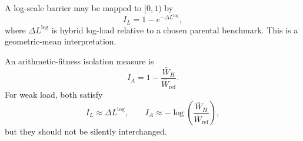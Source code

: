 A log-scale barrier may be mapped to \([0,1)\) by
\begin{equation}
I_L=1-e^{-\Delta L^{\log}},
\end{equation}
where \(\Delta L^{\log}\) is hybrid log-load relative to a chosen parental benchmark. This is a geometric-mean interpretation.

An arithmetic-fitness isolation measure is
\begin{equation}
I_A=1-\frac{\bar W_H}{\bar W_{\mathrm{ref}}}.
\end{equation}
For weak load, both satisfy
\begin{equation}
I_L\approx\Delta L^{\log},
\qquad
I_A\approx-\log\left(\frac{\bar W_H}{\bar W_{\mathrm{ref}}}\right),
\end{equation}
but they should not be silently interchanged.
